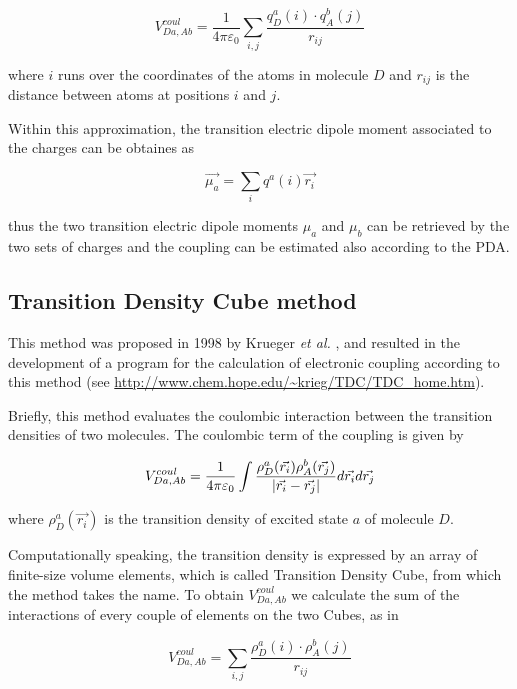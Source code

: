 \documentclass[a4paper]{article}
\DeclarePairedDelimiter\norm{\lvert}{\rvert}
\begin{document}
\begin{equation}
 V^{coul}_{Da,Ab} = \frac{1}{4\pi\varepsilon_0} \sum_{i,j} \frac{q_D^a(i)\cdot q_A^b(j)}{r_{ij}}
 \label{eq:MMA}
\end{equation}

where $i$ runs over the coordinates of the atoms in molecule $D$ and $r_{ij}$ is the distance between atoms at positions $i$ and $j$.

Within this approximation, the transition electric dipole moment associated to the charges can be obtaines as

\begin{equation}
 \vec{\mu_a} = \sum_i q^a(i) \vec{r_i}
 \label{eq:mu_MMA}
\end{equation}

thus the two transition electric dipole moments $\mu_a$ and $\mu_b$ can be retrieved by the two sets of charges and the coupling can be estimated also according to the PDA.

\subsection*{Transition Density Cube method}
This method was proposed in 1998 by Krueger \textit{et al.} \cite{Krueger1998}, and resulted in the development of a program for the calculation of electronic coupling according to this method (see \url{http://www.chem.hope.edu/~krieg/TDC/TDC_home.htm}).

Briefly, this method evaluates the coulombic interaction between the transition densities of two molecules. The coulombic term of the coupling is given by

\begin{equation}
 V^{coul}_{Da,Ab} = \frac{1}{4\pi\varepsilon_0} \int \frac{\rho_D^a(\vec{r_i})\rho_A^b(\vec{r_j})}{\norm{\vec{r_i} - \vec{r_j}}} d\vec{r_i} d\vec{r_j}
 \label{eq:TDC}
\end{equation}

where $\rho_D^a(\vec{r_i})$ is the transition density of excited state $a$ of molecule $D$.

Computationally speaking, the transition density is expressed by an array of finite-size volume elements, which is called Transition Density Cube, from which the method takes the name. To obtain $V^{coul}_{Da,Ab}$ we calculate the sum of the interactions of every couple of elements on the two Cubes, as in

\begin{equation}
 V^{coul}_{Da,Ab} = \sum_{i,j} \frac{\rho_D^a(i)\cdot \rho_A^b(j)}{r_{ij}}
 \label{eq:TDC1}
\end{equation}
\end{document}
